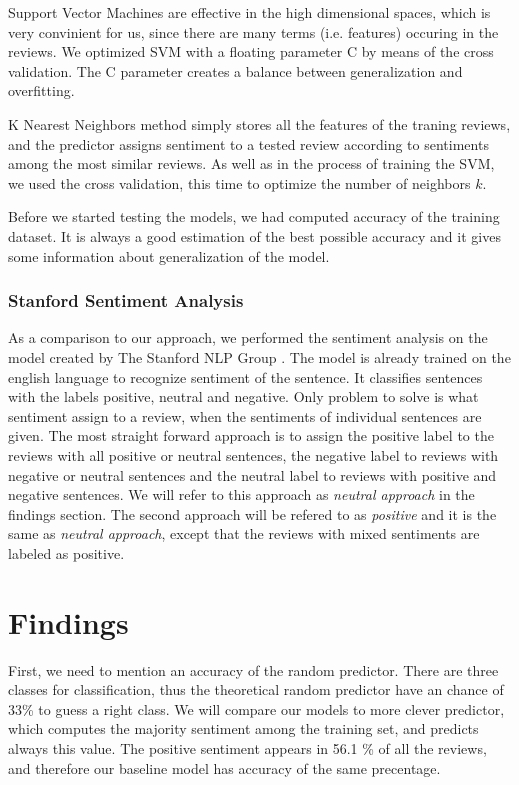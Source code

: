 \documentclass{sig-alternate}
\begin{document}
Support Vector Machines are effective in the high dimensional spaces, which is very convinient for us, since there are many terms (i.e. features) occuring in the reviews.
We optimized SVM with a floating parameter C by means of the cross validation.
The C parameter creates a balance between generalization and overfitting.

K Nearest Neighbors method simply stores all the features of the traning reviews, and the predictor assigns sentiment to a tested review  according to sentiments among the most similar reviews.
As well as in the process of training the SVM, we used the cross validation, this time to optimize the number of neighbors $k$.

Before we started testing the models, we had computed accuracy of the training dataset.
It is always a good estimation of the best possible accuracy and it gives some information about generalization of the model.

\subsubsection{Stanford Sentiment Analysis}
As a comparison to our approach, we performed the sentiment analysis on the model created by The Stanford NLP Group \cite{stanfnlp}.
The model is already trained on the english language to recognize sentiment of the sentence.
It classifies sentences with the labels positive, neutral and negative.
Only problem to solve is what sentiment assign to a review, when the sentiments of individual sentences are given.
The most straight forward approach is to assign the positive label to the reviews with all positive or neutral sentences, the negative label to reviews with negative or neutral sentences and the neutral label to reviews with positive and negative sentences.
We will refer to this approach as {\it neutral approach} in the findings section.
The second approach will be refered to as {\it positive} and it is the same as {\it neutral approach}, except that the reviews with mixed sentiments are labeled as positive.

\section{Findings}
First, we need to mention an accuracy of the random predictor.
There are three classes for classification, thus the theoretical random predictor have an chance of 33\% to guess a right class.
We will compare our models to more clever predictor, which computes the majority sentiment among the training set, and predicts always this value.
The positive sentiment appears in 56.1 \% of all the reviews, and therefore our baseline model has accuracy of the same precentage.
\end{document}
